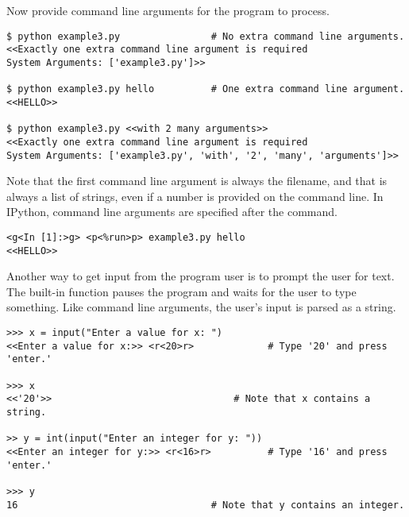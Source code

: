 Now provide command line arguments for the program to process.

\begin{lstlisting}
$ python example3.py                # No extra command line arguments.
<<Exactly one extra command line argument is required
System Arguments: ['example3.py']>>

$ python example3.py hello          # One extra command line argument.
<<HELLO>>

$ python example3.py <<with 2 many arguments>>
<<Exactly one extra command line argument is required
System Arguments: ['example3.py', 'with', '2', 'many', 'arguments']>>
\end{lstlisting}

Note that the first command line argument is always the filename, and that  is always a list of strings, even if a number is provided on the command line.
In IPython, command line arguments are specified after the  command.

\begin{lstlisting}
<g<In [1]:>g> <p<%run>p> example3.py hello
<<HELLO>>
\end{lstlisting}

Another way to get input from the program user is to prompt the user for text.
The built-in function  pauses the program and waits for the user to type something.
Like command line arguments, the user's input is parsed as a string.

\begin{lstlisting}
>>> x = input("Enter a value for x: ")
<<Enter a value for x:>> <r<20>r>             # Type '20' and press 'enter.'

>>> x
<<'20'>>                                # Note that x contains a string.

>> y = int(input("Enter an integer for y: "))
<<Enter an integer for y:>> <r<16>r>          # Type '16' and press 'enter.'

>>> y
16                                  # Note that y contains an integer.
\end{lstlisting}

